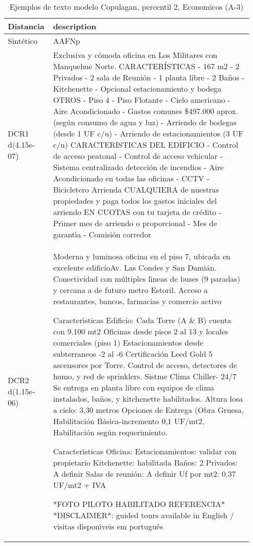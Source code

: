 \begin{table}[H]
\centering
\fontsize{10}{14}\selectfont
\caption{Ejemplos de texto modelo Copulagan, percentil 2, Economicos (A-3)}
\label{table-example-economicos-a-3-copulagan-2p-text}
\begin{tabular}{|l|m{35em}|}
\hline
\rowcolor[gray]{0.8}
Distancia & description \\
\hline Sintético & AAFNp \\
\hline DCR1 d(4.15e-07) & Exclusiva y c\'omoda oficina en Los Militares con Manquehue Norte.  CARACTER\'ISTICAS - 167 m2 - 2 Privados - 2 sala de Reuni\'on - 1 planta libre - 2 Ba\~nos - Kitchenette - Opcional estacionamiento y bodega  OTROS - Piso 4 - Piso Flotante - Cielo americano  - Aire Acondicionado - Gastos comunes \$497.000 aprox. (seg\'un consumo de agua y luz) - Arriendo de bodegas (desde 1 UF c/u) - Arriendo de estacionamientos (3 UF c/u)  CARACTERISTICAS DEL EDIFICIO - Control de acceso peatonal - Control de acceso vehicular - Sistema centralizado detecci\'on de incendios - Aire Acondicionado en todas las oficinas - CCTV - Bicicletero  Arrienda CUALQUIERA de nuestras propiedades y paga todos los gastos iniciales del arriendo EN CUOTAS con tu tarjeta de cr\'edito - Primer mes de arriendo o proporcional - Mes de garant{\'\i}a - Comisi\'on corredor \\
\hline DCR2 d(1.15e-06) & Moderna y luminosa oficina en el piso 7, ubicada en excelente edificioAv. Las Condes y San Dami\'an. Conectividad con m\'ultiples l{\'\i}neas de buses (9 paradas) y cercana a de futuro metro Estoril. Acceso a restaurantes, bancos, farmacias y comercio activo

Caracter{\'\i}sticas Edificio:
 Cada Torre (A \& B) cuenta con 9.100 mt2
Oficinas desde pisos 2 al 13 y locales comerciales (piso 1)
 Estacionamientos desde subterraneos -2 al -6
Certificaci\'on Leed Gold
5 ascensores por Torre.
Control de acceso, detectores de humo, y red de sprinklers.
Sistme Clima Chiller- 24/7
 Se entrega en planta libre con equipos de clima instalados, ba\~nos, y kitchenette habilitados.
Altura losa a cielo: 3,30 metros
Opciones de Entrega (Obra Gruesa, Habilitaci\'on B\'asica-incremento 0,1 UF/mt2, Habilitaci\'on seg\'un requerimiento.

Caracter{\'\i}sticas Oficina:
 Estacionamientos: validar con propietario
Kitchenette: habilitada
Ba\~nos: 2
Privados: A definir
Salas de reuni\'on: A definir
Uf por mt2: 0,37 UF/mt2 + IVA

*FOTO PILOTO HABILITADO REFERENCIA*
*DISCLAIMER*: guided tours available in English / visitas dispon{\'\i}veis em portugu\^es \\
\hline
\end{tabular}
\end{table}
